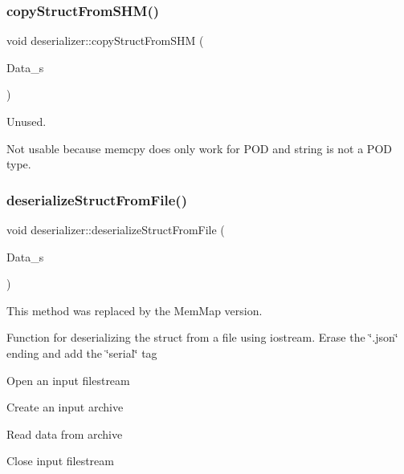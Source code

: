 \subsubsection{\texorpdfstring{copy\+Struct\+From\+S\+H\+M()}{copyStructFromSHM()}}
{\footnotesize\ttfamily void deserializer\+::copy\+Struct\+From\+S\+HM (\begin{DoxyParamCaption}\item[{\hyperlink{structUMGR__s}{U\+M\+G\+R\+\_\+s} $\ast$}]{Data\+\_\+s }\end{DoxyParamCaption})}



Unused. 

Not usable because memcpy does only work for P\+OD and string is not a P\+OD type. \mbox{\label{classdeserializer_ab70dbab4bfa05c09a648b02514be8c2f}} 
\subsubsection{\texorpdfstring{deserialize\+Struct\+From\+File()}{deserializeStructFromFile()}\hspace{0.1cm}{\footnotesize\ttfamily [1/2]}}
{\footnotesize\ttfamily void deserializer\+::deserialize\+Struct\+From\+File (\begin{DoxyParamCaption}\item[{\hyperlink{structUMGR__s}{U\+M\+G\+R\+\_\+s} $\ast$}]{Data\+\_\+s }\end{DoxyParamCaption})}



This method was replaced by the Mem\+Map version. 

Function for deserializing the struct from a file using iostream. Erase the \char`\"{}.\+json\char`\"{} ending and add the \char`\"{}serial\char`\"{} tag

Open an input filestream

Create an input archive

Read data from archive

Close input filestream \mbox{\label{classdeserializer_a545372d67a9795603afe503efc98f6f3}} 
